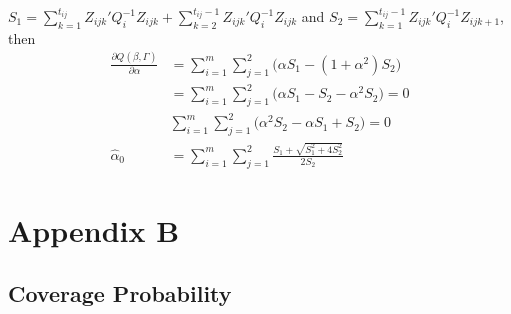 \documentclass[
]{aft}
\begin{document}
\(S_1 = \sum_{k=1}^{t_{ij}} Z_{ijk}'Q_i^{-1} Z_{ijk} + \sum_{k=2}^{t_{ij} - 1}Z_{ijk}'Q_i^{-1} Z_{ijk}\)
and \(S_2 = \sum_{k=1}^{t_{ij} - 1}Z_{ijk}'Q_i^{-1}Z_{ijk+1}\), then \[
\begin{aligned}
\frac{\partial Q(\beta, \Gamma)}{\partial \alpha} &= \sum_{i=1}^m \sum_{j=1}^2 \big(\alpha S_1 - (1+\alpha^2) S_2\big) \\
&= \sum_{i=1}^m \sum_{j=1}^2\big(\alpha S_1 - S_2-\alpha^2S_2\big) = 0\\
& \sum_{i=1}^m \sum_{j=1}^2\big(\alpha^2 S_2 -\alpha S_1 + S_2\big) = 0\\
\hat{\alpha}_0 &= \sum_{i=1}^m \sum_{j=1}^2\frac{S_1+\sqrt{S_1^2+4S_2^2}}{2S_2}
\end{aligned}
\]

\newpage

\section{Appendix B}\label{appendix-b}

\subsection{Coverage Probability}\label{coverage-probability}
\end{document}
